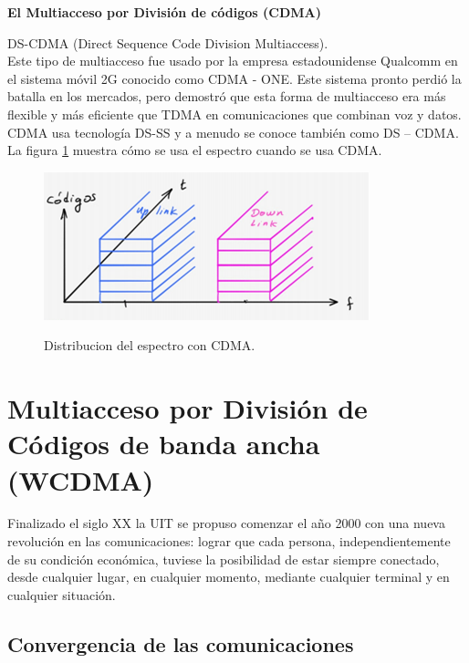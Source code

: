 \textbf{El Multiacceso por División de códigos (CDMA)}

DS-CDMA (Direct Sequence Code Division Multiaccess).\\

Este tipo de multiacceso fue usado por la empresa estadounidense Qualcomm en el sistema móvil 2G conocido como CDMA - ONE. Este sistema pronto perdió la batalla en los mercados, pero demostró que esta forma de multiacceso era más flexible y más eficiente que TDMA en comunicaciones que combinan voz y datos.\\

CDMA usa tecnología DS-SS y a menudo se conoce también como DS – CDMA. La figura  \ref{fig:Cuadrado-link} muestra cómo se usa el espectro cuando se usa CDMA.

\begin{figure}[h!]
	\captionsetup{justification = raggedright, singlelinecheck = false}
	\caption{Distribucion del espectro con CDMA.} 
	\centering
	\includegraphics[scale=1]{Imagenes/Cuadrado-link.png}
	\label{fig:Cuadrado-link}
\end{figure}

\section{Multiacceso por División de Códigos de banda ancha (WCDMA)}

Finalizado el siglo XX la UIT se propuso comenzar el año 2000 con una nueva revolución en las comunicaciones: lograr que cada persona, independientemente de su condición económica, tuviese la posibilidad de estar siempre conectado, desde cualquier lugar, en cualquier momento, mediante cualquier terminal y en cualquier situación.

\subsection{Convergencia de las comunicaciones}

